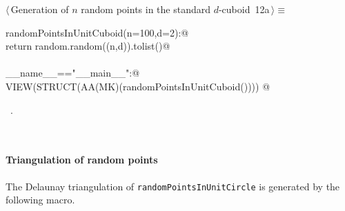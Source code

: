 \documentclass[11pt,oneside]{article}	%
\begin{document}
\begin{flushleft} \small
\begin{minipage}{\linewidth} \label{scrap18}
\protect{}$\langle\,$Generation of $n$ random points in the standard $d$-cuboid\nobreak\ {\footnotesize 12a}$\,\rangle\equiv$
\vspace{-1ex}
\begin{list}{}{} \item
\mbox{}\verb@def randomPointsInUnitCuboid(n=100,d=2):@\\
\mbox{}\verb@   return random.random((n,d)).tolist()@\\
\mbox{}\verb@@\\
\mbox{}\verb@if __name__=="__main__":@\\
\mbox{}\verb@   VIEW(STRUCT(AA(MK)(randomPointsInUnitCuboid()))) @\\
\mbox{}\verb@@{\NWsep}
\end{list}
\vspace{-1ex}
\footnotesize\addtolength{\baselineskip}{-1ex}
\begin{list}{}{\setlength{\itemsep}{-\parsep}\setlength{\itemindent}{-\leftmargin}}
\item \NWtxtMacroRefIn\ .
\end{list}
\end{minipage}\\[4ex]
\end{flushleft}



\paragraph{Triangulation of random points} The Delaunay triangulation of \texttt{randomPointsInUnitCircle} is generated by the following macro.
\end{document}
